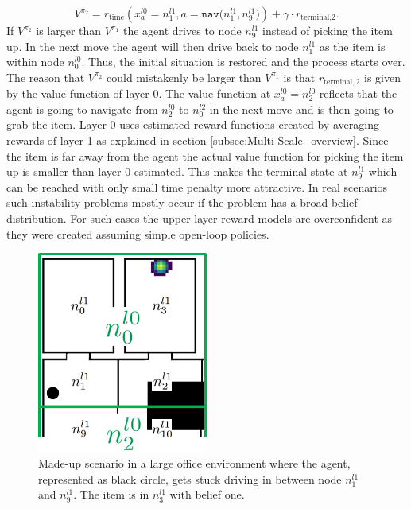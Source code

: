 %
\begin{equation}\label{eq:Vpi2}
V^{\pi_2}=r_\text{time}\left( x_a^{l0}=n_1^{l1}, a=\texttt{nav($n_1^{l1}, n_9^{l1}$)} \right) + \gamma \cdot r_{\text{terminal,}2}.
\end{equation}
If $V^{\pi_2}$ is larger than $V^{\pi_1}$ the agent drives to node $n_9^{l1}$ instead of picking the item up. In the next move the agent will then drive back to node $n_1^{l1}$ as the item is within node $n_0^{l0}$. Thus, the initial situation is restored and the process starts over. The reason that $V^{\pi_2}$ could mistakenly be larger than $V^{\pi_1}$ is that $r_{\text{terminal},2}$ is given by the value function of layer 0. The value function at $x_a^{l0}=n_2^{l0}$ reflects that the agent is going to navigate from $n_2^{l0}$ to $n_0^{l2}$ in the next move and is then going to grab the item. Layer 0 uses estimated reward functions created by averaging rewards of layer 1 as explained in section \ref{subsec:Multi-Scale_overview}. Since the item is far away from the agent the actual value function for picking the item up is smaller than layer 0 estimated. This makes the terminal state at $n_9^{l1}$ which can be reached with only small time penalty more attractive. In real scenarios such instability problems mostly occur if the problem has a broad belief distribution. For such cases the upper layer reward models are overconfident as they were created assuming simple open-loop policies.   

\begin{figure}
    \centering
    \includegraphics[width=0.5\textwidth]{Report/images/stability.png}
    \caption{Made-up scenario in a large office environment where the agent, represented as black circle, gets stuck driving in between node $n_1^{l1}$ and $n_9^{l1}$. The item is in $n_3^{l1}$ with belief one.}
    \label{fig:stability}
\end{figure}

